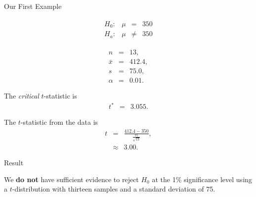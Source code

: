 \begin{frame}{Our First Example}


    \begin{eqnarray*}
      \begin{array}{lrcl}
        H_0: & \mu & = & 350 \\
        H_a: & \mu & \neq & 350
      \end{array}
    \end{eqnarray*}

    \begin{eqnarray*}
      n & = & 13, \\
      \bar{x} & = & 412.4,\\
      s      & = & 75.0, \\
      \alpha & = & 0.01.
    \end{eqnarray*}

    \vfill 

    The \textit{critical} $t$-statistic is 
    \begin{eqnarray*}
      t^* & = & 3.055.
    \end{eqnarray*}

    The $t$-statistic from the data is
    \begin{eqnarray*}
      t & = & \frac{412.4-350}{\frac{75}{\sqrt{13}}}, \\
        & \approx & 3.00.
    \end{eqnarray*}



\end{frame}

\begin{frame}{Result}

  We \textbf{do not} have sufficient evidence to reject $H_0$ at the
  1\% significance level using a $t$-distribution with thirteen
  samples and a standard deviation of 75.
  
\end{frame}


